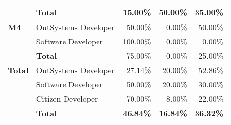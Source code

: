 \begin{table}[tb]
\begin{tabular}{@{}llrrr@{}}
                              & \textbf{Total}       & 15.00\%                                                           & 50.00\%                                                                 & 35.00\%                                                       \\ \midrule
    \textbf{M4}               & OutSystems Developer & 50.00\%                                                           & 0.00\%                                                                  & 50.00\%                                                       \\
                              & Software Developer   & 100.00\%                                                          & 0.00\%                                                                  & 0.00\%                                                        \\
                              & \textbf{Total}       & 75.00\%                                                           & 0.00\%                                                                  & 25.00\%                                                       \\ \midrule
    \rowcolor[HTML]{EFEFEF} 
    \textbf{Total}            & OutSystems Developer & 27.14\%                                                           & 20.00\%                                                                 & 52.86\%                                                       \\
    \rowcolor[HTML]{EFEFEF} 
                              & Software Developer   & 50.00\%                                                           & 20.00\%                                                                 & 30.00\%                                                       \\
    \rowcolor[HTML]{EFEFEF} 
                              & Citizen Developer    & 70.00\%                                                           & 8.00\%                                                                  & 22.00\%                                                       \\
    \rowcolor[HTML]{EFEFEF} 
                              & \textbf{Total}       & \textbf{46.84\%}                                                  & \textbf{16.84\%}                                                        & \textbf{36.32\%}                                              \\ \bottomrule
    \end{tabular}
    \end{table}

